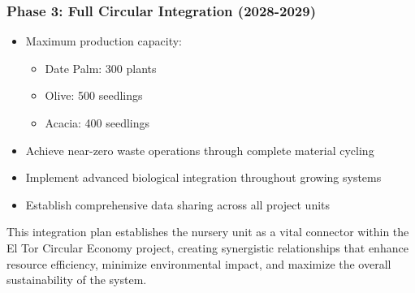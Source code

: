 \subsubsection{Phase 3: Full Circular Integration (2028-2029)}
\begin{itemize}
    \item Maximum production capacity:
    \begin{itemize}
        \item Date Palm: 300 plants
        \item Olive: 500 seedlings
        \item Acacia: 400 seedlings
    \end{itemize}
    \item Achieve near-zero waste operations through complete material cycling
    \item Implement advanced biological integration throughout growing systems
    \item Establish comprehensive data sharing across all project units
\end{itemize}

This integration plan establishes the nursery unit as a vital connector within the El Tor Circular Economy project, creating synergistic relationships that enhance resource efficiency, minimize environmental impact, and maximize the overall sustainability of the system. 